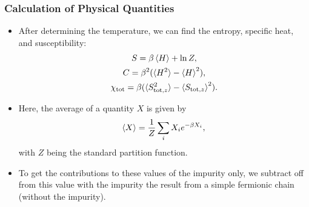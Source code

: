 \documentclass{beamer}
\begin{document}
\begin{frame}
  \frametitle{Calculation of Physical Quantities}

  \begin{itemize}
  \item After determining the temperature, we can find the entropy, specific heat, and susceptibility:
    \begin{gather*}
      S = \beta\braket{H} + \ln Z, \\
      C = \beta^2(\braket{H^2} - \braket{H}^2), \\
      \chi_{\mathrm{tot}} =\beta(\braket{S_{\mathrm{tot},z}^2} - \braket{S_{\mathrm{tot},z}}^2).
    \end{gather*}
  \item Here, the average of a quantity $X$ is given by
    \begin{gather*}
      \braket{X} = \frac{1}{Z} \sum_i X_i e^{-\beta X_i},
    \end{gather*}
    with $Z$ being the standard partition function.
  \item To get the contributions to these values of the impurity only, we subtract off from this value with the impurity the result from a simple fermionic chain (without the impurity).
  \end{itemize}
\end{frame}
\end{document}
